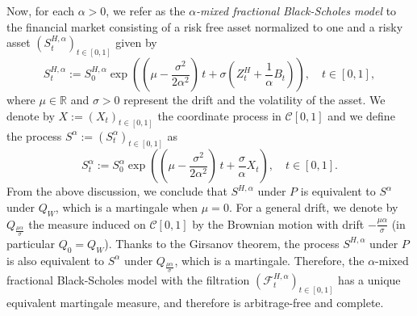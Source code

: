 \documentclass[reqno,a4paper]{amsart}
\theoremstyle{plain}
\theoremstyle{definition}
\theoremstyle{plain}
\theoremstyle{plain}
\theoremstyle{plain}
\begin{document}
Now, for each $\alpha>0$, we refer as the \textit{$\alpha$-mixed fractional Black-Scholes model} to the financial market consisting of a risk free asset normalized to one and a risky asset $(S_t^{H,\alpha})_{t\in[0,1]}$ given by
\begin{equation}\label{smm}
 S_t^{H,\alpha}:=S_0^{H,\alpha} \exp\left(\left(\mu-\frac{\sigma^2}{2\alpha^2}\right)\, t+\sigma \left(Z_t^H+\frac{1}{\alpha} B_t\right)\right),\quad t\in [0,1],
\end{equation}
where $\mu\in{{\mathbb R}}$ and $\sigma>0$ represent the drift and the volatility of the asset. We denote by $X:=(X_{t})_{t\in[0,1]}$ the coordinate process in ${{\mathcal C}}[0,1]$ and we define the process $S^\alpha:=(S^\alpha_t)_{t\in[0,1]}$ as
\begin{equation}\label{sm}
 S^\alpha_t:=S^\alpha_0 \exp\left(\left(\mu-\frac{\sigma^2}{2\alpha^2}\right)\, t+\frac{\sigma}{\alpha} X_t\right),\quad t\in [0,1].
\end{equation}
From the above discussion, we conclude that $S^{H,\alpha}$ under $P$ is equivalent to $S^\alpha$ under $Q_W$, which is a martingale when $\mu=0$. For a general drift, we denote by $Q_{\frac{\mu\alpha}{\sigma}}$ the measure induced on ${{\mathcal C}}[0,1]$ by the Brownian motion with drift $-\frac{\mu\alpha}{\sigma}$ (in particular $Q_0=Q_W$). Thanks to the Girsanov theorem, the process $S^{H,\alpha}$ under $P$ is also equivalent to $S^\alpha$ under $Q_{\frac{\mu\alpha}{\sigma}}$, which is a martingale. Therefore, the $\alpha$-mixed fractional Black-Scholes model with the filtration $({{\mathcal F}}_t^{H,\alpha})_{t\in[0,1]}$ has a unique equivalent martingale measure, and therefore is arbitrage-free and complete.
\end{document}
